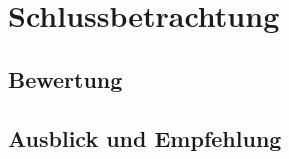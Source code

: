\chapter{Schlussbetrachtung}
\label{chap:schlussbetrachtung}

\section{Bewertung}
\label{sec:bewertung}


\section{Ausblick und Empfehlung}
\label{sec:ausblick-und-empfehlung}
